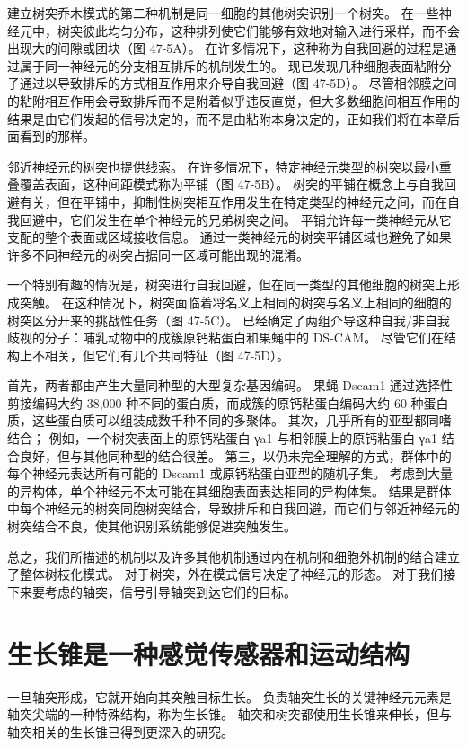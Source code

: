 建立树突乔木模式的第二种机制是同一细胞的其他树突识别一个树突。 在一些神经元中，树突彼此均匀分布，这种排列使它们能够有效地对输入进行采样，而不会出现大的间隙或团块（图 47-5A）。 在许多情况下，这种称为自我回避的过程是通过属于同一神经元的分支相互排斥的机制发生的。 现已发现几种细胞表面粘附分子通过以导致排斥的方式相互作用来介导自我回避（图 47-5D）。 尽管相邻膜之间的粘附相互作用会导致排斥而不是附着似乎违反直觉，但大多数细胞间相互作用的结果是由它们发起的信号决定的，而不是由粘附本身决定的，正如我们将在本章后面看到的那样。

邻近神经元的树突也提供线索。 在许多情况下，特定神经元类型的树突以最小重叠覆盖表面，这种间距模式称为平铺（图 47-5B）。 树突的平铺在概念上与自我回避有关，但在平铺中，抑制性树突相互作用发生在特定类型的神经元之间，而在自我回避中，它们发生在单个神经元的兄弟树突之间。 平铺允许每一类神经元从它支配的整个表面或区域接收信息。 通过一类神经元的树突平铺区域也避免了如果许多不同神经元的树突占据同一区域可能出现的混淆。

一个特别有趣的情况是，树突进行自我回避，但在同一类型的其他细胞的树突上形成突触。 在这种情况下，树突面临着将名义上相同的树突与名义上相同的细胞的树突区分开来的挑战性任务（图 47-5C）。 已经确定了两组介导这种自我/非自我歧视的分子：哺乳动物中的成簇原钙粘蛋白和果蝇中的 DS-CAM。 尽管它们在结构上不相关，但它们有几个共同特征（图 47-5D）。

首先，两者都由产生大量同种型的大型复杂基因编码。 果蝇 Dscam1 通过选择性剪接编码大约 38,000 种不同的蛋白质，而成簇的原钙粘蛋白编码大约 60 种蛋白质，这些蛋白质可以组装成数千种不同的多聚体。 其次，几乎所有的亚型都同嗜结合； 例如，一个树突表面上的原钙粘蛋白 γa1 与相邻膜上的原钙粘蛋白 γa1 结合良好，但与其他同种型的结合很差。 第三，以仍未完全理解的方式，群体中的每个神经元表达所有可能的 Dscam1 或原钙粘蛋白亚型的随机子集。 考虑到大量的异构体，单个神经元不太可能在其细胞表面表达相同的异构体集。 结果是群体中每个神经元的树突同胞树突结合，导致排斥和自我回避，而它们与邻近神经元的树突结合不良，使其他识别系统能够促进突触发生。

总之，我们所描述的机制以及许多其他机制通过内在机制和细胞外机制的结合建立了整体树枝化模式。 对于树突，外在模式信号决定了神经元的形态。 对于我们接下来要考虑的轴突，信号引导轴突到达它们的目标。

\section{生长锥是一种感觉传感器和运动结构}
一旦轴突形成，它就开始向其突触目标生长。 负责轴突生长的关键神经元元素是轴突尖端的一种特殊结构，称为生长锥。 轴突和树突都使用生长锥来伸长，但与轴突相关的生长锥已得到更深入的研究。

